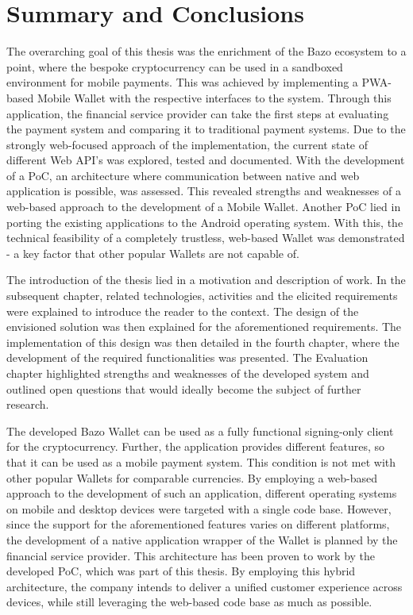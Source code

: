 \chapter{Summary and Conclusions}

The overarching goal of this thesis was the enrichment of the Bazo ecosystem to a point, where the bespoke cryptocurrency can be used in a sandboxed environment for mobile payments. This was achieved by implementing a PWA-based Mobile Wallet with the respective interfaces to the system. Through this application, the financial service provider can take the first steps at evaluating the payment system and comparing it to traditional payment systems. Due to the strongly web-focused approach of the implementation, the current state of different Web API's was explored, tested and documented. With the development of a PoC, an architecture where communication between native and web application is possible, was assessed. This revealed strengths and weaknesses of a web-based approach to the development of a Mobile Wallet. Another PoC lied in porting the existing applications to the Android operating system. With this, the technical feasibility of a completely trustless, web-based Wallet was demonstrated - a key factor that other popular Wallets are not capable of.

The introduction of the thesis lied in a motivation and description of work. In the subsequent chapter, related technologies, activities and the elicited requirements were explained to introduce the reader to the context. The design of the envisioned solution was then explained for the aforementioned requirements. The implementation of this design was then detailed in the fourth chapter, where the development of the required functionalities was presented. The Evaluation chapter highlighted strengths and weaknesses of the developed system and outlined open questions that would ideally become the subject of further research.

The developed Bazo Wallet can be used as a fully functional signing-only client for the cryptocurrency. Further, the application provides different features, so that it can be used as a mobile payment system. This condition is not met with other popular Wallets for comparable currencies. By employing a web-based approach to the development of such an application, different operating systems on mobile and desktop devices were targeted with a single code base. However, since the support for the aforementioned features varies on different platforms, the development of a native application wrapper of the Wallet is planned by the financial service provider. This architecture has been proven to work by the developed PoC, which was part of this thesis. By employing this hybrid architecture, the company intends to deliver a unified customer experience across devices, while still leveraging the web-based code base as much as possible.